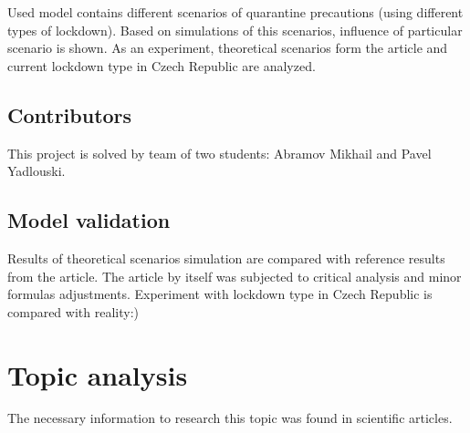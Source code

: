 \documentclass[12pt,a4paper,english]{article}
\newcommand{\todo}[1]{\textcolor{red}{[[\textbf{TODO} \textbf{#1]]}}}
\begin{document}
    Used model contains different scenarios of quarantine precautions (using different types of lockdown).
    Based on simulations of this scenarios, influence of particular scenario is shown. 
    As an experiment, theoretical scenarios form the article and current lockdown type in Czech Republic are analyzed.

    \subsection{Contributors}    
    This project is solved by team of two students: Abramov Mikhail and Pavel 
    Yadlouski.

    \subsection{Model validation}
    Results of theoretical scenarios simulation are compared with reference results from the article. 
    The article by itself was subjected to critical analysis and minor formulas adjustments.
    Experiment with lockdown type in Czech Republic is compared with reality:) 
    
    
    \section{Topic analysis}
    The necessary information to research this topic was found in scientific articles.
\end{document}
